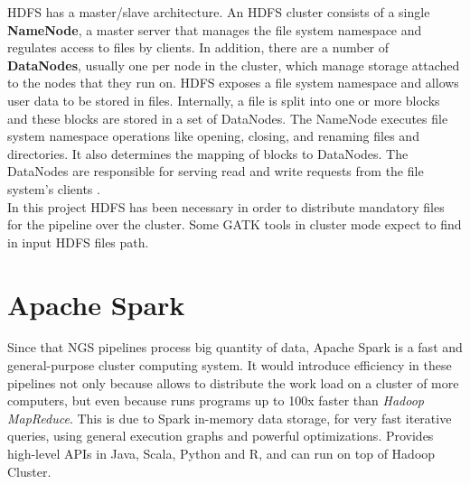 HDFS has a master/slave architecture. An HDFS cluster consists of a single \textbf{NameNode}, a master server that manages the file system namespace and regulates access to files by clients. In addition, there are a number of \textbf{DataNodes}, usually one per node in the cluster, which manage storage attached to the nodes that they run on. HDFS exposes a file system namespace and allows user data to be stored in files. Internally, a file is split into one or more blocks and these blocks are stored in a set of DataNodes. The NameNode executes file system namespace operations like opening, closing, and renaming files and directories. It also determines the mapping of blocks to DataNodes. The DataNodes are responsible for serving read and write requests from the file system's clients \cite{HDFS}.
\\[1\baselineskip]
In this project HDFS has been necessary in order to distribute mandatory files for the pipeline over the cluster. Some GATK tools in cluster mode expect to find in input HDFS files path.

\section{Apache Spark}
Since that NGS pipelines process big quantity of data, Apache Spark is a fast and general-purpose cluster computing system. It would introduce efficiency in these pipelines not only because allows to distribute the work load on a cluster of more computers, but even because runs programs up to 100x faster than \textit{Hadoop MapReduce}. This is due to Spark in-memory data storage, for very fast iterative queries, using general execution graphs and powerful optimizations. Provides high-level APIs in Java, Scala, Python and R, and can run on top of Hadoop Cluster.

